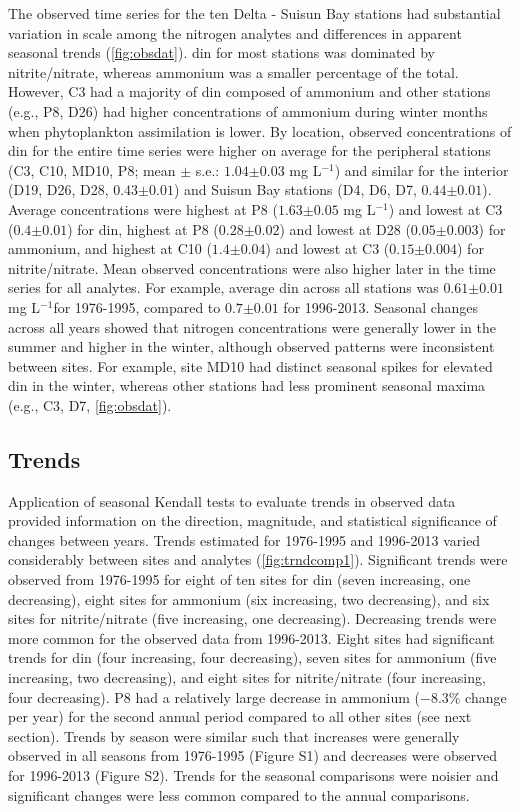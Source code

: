\documentclass[journal = esthag, manuscript = article]{achemso}\usepackage[]{graphicx}\usepackage[]{color}
\newcommand{\mgl}{mg L$^{-1}$}
\begin{document}
The observed time series for the ten Delta - Suisun Bay stations had substantial variation in scale among the nitrogen analytes and differences in apparent seasonal trends (\cref{fig:obsdat}).  \ac{din} for most stations was dominated by nitrite/nitrate, whereas ammonium was a smaller percentage of the total.  However, C3 had a majority of \ac{din} composed of ammonium and other stations (e.g., P8, D26) had higher concentrations of ammonium during winter months when phytoplankton assimilation is lower\cite{Novick15}.  By location, observed concentrations of \ac{din} for the entire time series were higher on average for the peripheral stations (C3, C10, MD10, P8; mean $\pm$ s.e.: $1.04$$\pm$$0.03$ \mgl) and similar for the interior (D19, D26, D28, $0.43$$\pm$$0.01$) and Suisun Bay stations (D4, D6, D7, $0.44$$\pm$$0.01$).  Average concentrations were highest at P8 ($1.63$$\pm$$0.05$ \mgl) and lowest at C3 ($0.4$$\pm$$0.01$) for \ac{din}, highest at P8 ($0.28$$\pm$$0.02$) and lowest at D28 ($0.05$$\pm$$0.003$) for ammonium, and highest at C10 ($1.4$$\pm$$0.04$) and lowest at C3 ($0.15$$\pm$$0.004$) for nitrite/nitrate. Mean observed concentrations were also higher later in the time series for all analytes.  For example, average \ac{din} across all stations was $0.61$$\pm$$0.01$ \mgl for 1976-1995, compared to $0.7$$\pm$$0.01$ for 1996-2013. Seasonal changes across all years showed that nitrogen concentrations were generally lower in the summer and higher in the winter, although observed patterns were inconsistent between sites.  For example, site MD10 had distinct seasonal spikes for elevated \ac{din} in the winter, whereas other stations had less prominent seasonal maxima (e.g., C3, D7, \cref{fig:obsdat}).  

\subsection{Trends}



Application of seasonal Kendall tests to evaluate trends in observed data provided information on the direction, magnitude, and statistical significance of changes between years. Trends estimated for 1976-1995 and 1996-2013 varied considerably between sites and analytes (\cref{fig:trndcomp1}). Significant trends were observed from 1976-1995 for eight of ten sites for \ac{din} (seven increasing, one decreasing), eight sites for ammonium (six increasing, two decreasing), and six sites for nitrite/nitrate (five increasing, one decreasing).  Decreasing trends were more common for the observed data from 1996-2013.  Eight sites had significant trends for \ac{din} (four increasing, four decreasing), seven sites for ammonium (five increasing, two decreasing), and eight sites for nitrite/nitrate (four increasing, four decreasing). P8 had a relatively large decrease in ammonium ($-8.3$\% change per year) for the second annual period compared to all other sites (see next section). Trends by season were similar such that increases were generally observed in all seasons from 1976-1995 (Figure S1) and decreases were observed for 1996-2013 (Figure S2).  Trends for the seasonal comparisons were noisier and significant changes were less common compared to the annual comparisons.
\end{document}
